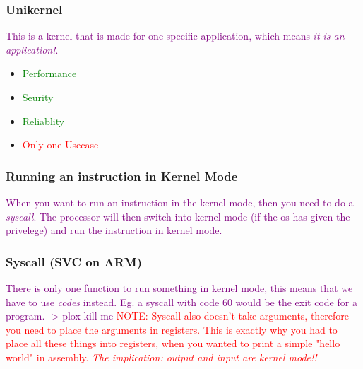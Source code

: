 \documentclass[main.tex,fontsize=8pt,paper=a4,paper=portrait,DIV=calc,]{scrartcl}
\begin{document}
\subsubsection{Unikernel}
\textcolor{purple}{This is a kernel that is made for one specific application, which means \emph{it is an application!}.}\newline
\begin{itemize}
\item \textcolor{green}{Performance}
\item \textcolor{green}{Seurity}
\item \textcolor{green}{Reliablity}
\item \textcolor{red}{Only one Usecase}
\end{itemize} 

\subsubsection{Running an instruction in Kernel Mode}
\textcolor{purple}{When you want to run an instruction in the kernel mode, then you need to do a \emph{syscall}.\newline
The processor will then switch into kernel mode (if the os has given the privelege) and run the instruction in kernel mode.}\newline

\subsubsection{Syscall (SVC on ARM)}
\textcolor{purple}{There is only one function to run something in kernel mode, this means that we have to use \emph{codes} instead.\newline
Eg. a syscall with code 60 would be the exit code for a program. -> plox kill me}\newline
\textcolor{red}{NOTE: Syscall also doesn't take arguments, therefore you need to place the arguments in registers. \newline
This is exactly why you had to place all these things into registers, when you wanted to print a simple "hello world" in assembly. \newline
\emph{The implication: output and input are kernel mode!!}}
\end{document}
